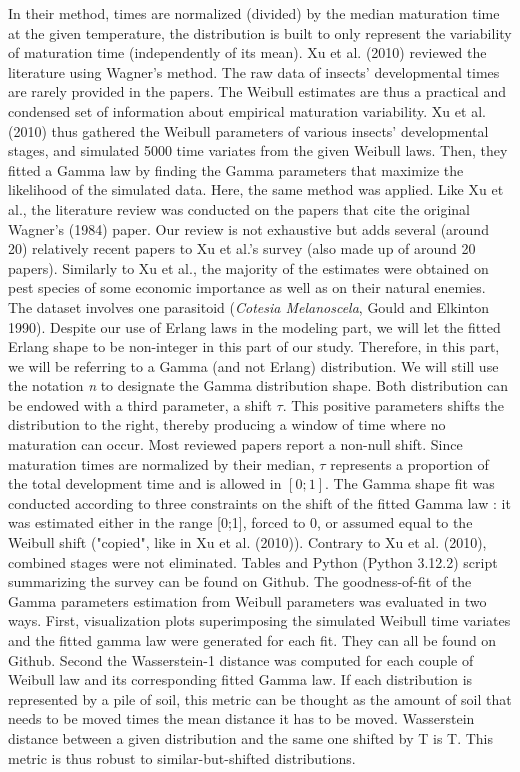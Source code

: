\documentclass[12pt,a4paper,onecolumn]{article}
\begin{document}
\tabto{1 cm} In their method, times are normalized (divided) by the median maturation time at the given temperature, the distribution is built to only represent the variability of maturation time (independently of its mean). Xu et al. (2010) reviewed the literature using Wagner's method. The raw data of insects' developmental times are rarely provided in the papers. The Weibull estimates are thus a practical and condensed set of information about empirical maturation variability. Xu et al. (2010) thus gathered the Weibull parameters of various insects' developmental stages, and simulated 5000 time variates from the given Weibull laws. Then, they fitted a Gamma law by finding the Gamma parameters that maximize the likelihood of the simulated data. 
\tabto{1 cm}  Here, the same method was applied. Like Xu et al., the literature review was conducted on the papers that cite the original Wagner's (1984) paper. Our review is not exhaustive but adds several (around 20) relatively recent papers to Xu et al.'s survey (also made up of around 20 papers). Similarly to Xu et al., the majority of the estimates were obtained on pest species of some economic importance as well as on their natural enemies. The dataset involves one parasitoid (\textit{Cotesia Melanoscela}, Gould and Elkinton 1990). Despite our use of Erlang laws in the modeling part, we will let the fitted Erlang shape to be non-integer in this part of our study. Therefore, in this part, we will be referring to a Gamma (and not Erlang) distribution. We will still use the notation \textit{n} to designate the Gamma distribution shape. Both distribution can be endowed with a third parameter, a shift $\tau$. This positive parameters shifts the distribution to the right, thereby producing a window of time where no maturation can occur. Most reviewed papers report a non-null shift. Since maturation times are normalized by their median, $\tau$ represents a proportion of the total development time and is allowed in $[0;1]$. The Gamma shape fit was conducted according to three constraints on the shift of the fitted Gamma law : it was estimated either in the range [0;1],  forced to 0, or assumed equal to the Weibull shift ("copied", like in Xu et al. (2010)). Contrary to Xu et al. (2010), combined stages were not eliminated. Tables and Python (Python 3.12.2) script summarizing the survey can be found on Github. 
\tabto{1 cm} The goodness-of-fit of the Gamma parameters estimation from Weibull parameters was evaluated in two ways. First, visualization plots superimposing the simulated Weibull time variates and the fitted gamma law were generated for each fit. They can all be found on Github. Second the Wasserstein-1 distance was computed for each couple of Weibull law and its corresponding fitted Gamma law. If each distribution is represented by a pile of soil, this metric can be thought as the amount of soil that needs to be moved times the mean distance it has to be moved. Wasserstein distance between a given distribution and the same one shifted by T is T. This metric is thus robust to similar-but-shifted distributions.
\end{document}
